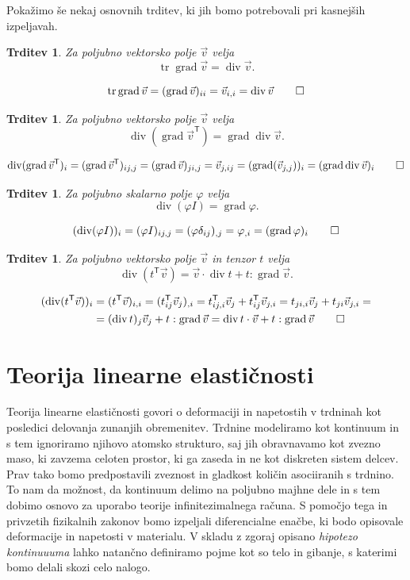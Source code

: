 \documentclass[12pt,a4paper]{article}
\theoremstyle{definition} %
\theoremstyle{plain} %
\newtheorem{trditev}[definicija]{Trditev}
\numberwithin{equation}{section}
\newcommand{\T}{\mathsf{T}}
\renewcommand{\div}{\operatorname{div}}
\newcommand{\grad}{\operatorname{grad}}
\renewcommand{\phi}{\varphi}
\newcommand{\vv}{\vec{v}}
\DeclareMathOperator{\tr}{tr}
\begin{document}
Pokažimo še nekaj osnovnih trditev, ki jih bomo potrebovali pri kasnejših
izpeljavah.
\begin{trditev}
  Za poljubno vektorsko polje $\vv$ velja
  \[ \tr\grad \vv = \div \vv. \]
\end{trditev}
\proof
\[
  \tr\grad\vv = (\grad\vv)_{ii} = \vv_{i,i} = \div \vv \qedhere
\]
\endproof
\begin{trditev}
  Za poljubno vektorsko polje $\vv$ velja
  \[ \div(\grad\vv^\T) = \grad\div \vv.  \]
\end{trditev}
\proof
\[
  \div(\grad \vv^\T)_i = (\grad\vv^\T)_{ij,j} = (\grad \vv)_{ji,j} = \vv_{j,ij}
  = (\grad(\vv_{j,j}))_i = (\grad\div \vv)_i \qedhere
\]
\endproof
\begin{trditev}
  Za poljubno skalarno polje $\phi$ velja
  \[ \div(\phi I) = \grad \phi.  \]
\end{trditev}
\proof
\[
  (\div(\phi I))_i = (\phi I)_{ij,j} = (\phi \delta_{ij})_{,j} = \phi_{,i} =
  (\grad \phi)_i \qedhere
\]
\endproof
\begin{trditev}
  Za poljubno vektorsko polje $\vv$ in tenzor $t$ velja
  \label{trd:div-tv}
  \[
    \div(t^\T \vv) = \vv \cdot \div t + t : \grad\vv.
    \]
\end{trditev}
\proof
\begin{align*}
  (\div(t^\T \vv))_i &= (t^\T\vv)_{i,i} = (t^\T_{ij} \vv_j)_{,i} =
    t^\T_{ij,i} \vv_j + t^\T_{ij} \vv_{j,i} =
    t_{ji,i} \vv_j + t_{ji} \vv_{j,i} = \\
    &=  (\div t)_j \vv_j + t:\grad \vv = \div t \cdot \vv + t:\grad \vv\qedhere
\end{align*}
\endproof

\section{Teorija linearne elastičnosti}
\label{sec:mehanika}
Teorija linearne elastičnosti govori o deformaciji in napetostih v trdninah kot
posledici delovanja zunanjih obremenitev. Trdnine modeliramo kot kontinuum in
s tem ignoriramo njihovo atomsko strukturo, saj jih obravnavamo kot zvezno maso,
ki zavzema celoten prostor, ki ga zaseda in ne kot diskreten sistem delcev. Prav
tako bomo predpostavili zveznost in gladkost količin asociiranih s trdnino. To
nam da možnost, da kontinuum delimo na poljubno majhne dele in s tem dobimo
osnovo za uporabo teorije infinitezimalnega računa. S pomočjo tega in privzetih
fizikalnih zakonov bomo izpeljali diferencialne enačbe, ki bodo opisovale
deformacije in napetosti v materialu. V skladu z zgoraj opisano \emph{hipotezo
kontinuuuma} lahko natančno definiramo pojme kot so telo in gibanje, s katerimi
bomo delali skozi celo nalogo.
\end{document}
